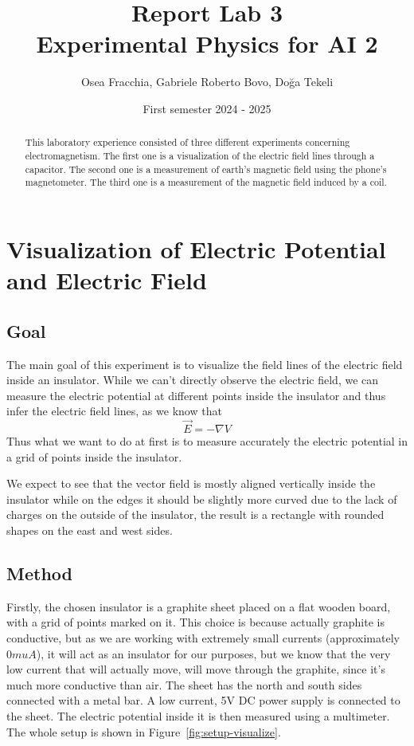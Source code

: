 \documentclass[notitlepage]{report}
\title{Report Lab 3\\\small Experimental Physics for AI 2}
\author{Osea Fracchia, Gabriele Roberto Bovo, Doğa Tekeli}
\date{First semester 2024 \-- 2025}
\numberwithin{equation}{section}
\theoremstyle{plain}
\theoremstyle{definition}
\theoremstyle{remark}
\begin{document}
\maketitle

\begin{abstract}
    This laboratory experience consisted of three different experiments
    concerning electromagnetism. The first one is a visualization of the
    electric field lines through a capacitor. The second one is a measurement of
    earth's magnetic field using the phone's magnetometer. The third one is a
    measurement of the magnetic field induced by a coil.
\end{abstract}


\chapter{Visualization of Electric Potential and Electric Field}

\section{Goal}
The main goal of this experiment is to visualize the field lines of the electric
field inside an insulator. While we can't directly observe the electric field, we
can measure the electric potential at different points inside the insulator and
thus infer the electric field lines, as we know that
\[
    \vec{E} = -\nabla V
\]
Thus what we want to do at first is to measure accurately the electric potential
in a grid of points inside the insulator.

We expect to see that the vector field is mostly aligned vertically inside the
insulator while on the edges it should be slightly more curved due to the lack
of charges on the outside of the insulator, the result is a rectangle with
rounded shapes on the east and west sides.
\section{Method}
Firstly, the chosen insulator is a graphite sheet placed on a flat wooden board,
with a grid of points marked on it. This choice is because actually graphite is
conductive, but as we are working with extremely small currents (approximately
0\(mu A\)), it will act as an insulator for our purposes, but we know that the
very low current that will actually move, will move through the graphite, since
it's much more conductive than air.
The sheet has the north and south sides connected with a metal bar. A
low current, 5V DC power supply is connected to the sheet. The electric
potential inside it is then measured using a multimeter. The whole
setup is shown in
Figure~\ref{fig:setup-visualize}.
\end{document}
